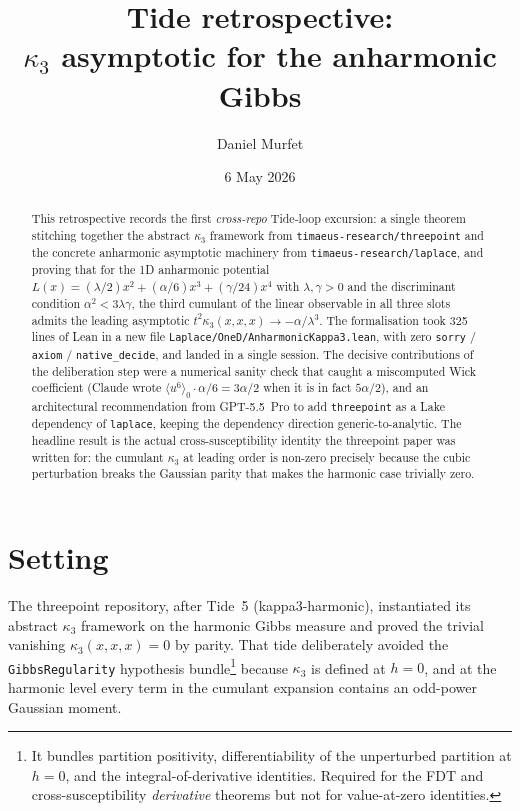 \documentclass[11pt]{article}
\title{Tide retrospective:\\$\kappa_3$ asymptotic for the anharmonic Gibbs}
\author{Daniel Murfet}
\date{6 May 2026}
\begin{document}
\maketitle

\begin{abstract}
This retrospective records the first \emph{cross-repo} Tide-loop
excursion: a single theorem stitching together the abstract $\kappa_3$
framework from \texttt{timaeus-research/threepoint} and the concrete
anharmonic asymptotic machinery from \texttt{timaeus-research/laplace},
and proving that for the 1D anharmonic potential
$L(x) = (\lambda/2)x^2 + (\alpha/6)x^3 + (\gamma/24)x^4$ with
$\lambda, \gamma > 0$ and the discriminant condition $\alpha^2 < 3\lambda\gamma$,
the third cumulant of the linear observable in all three slots admits
the leading asymptotic
$t^2 \kappa_3(x, x, x) \to -\alpha/\lambda^3$. The formalisation took
325 lines of Lean in a new file \texttt{Laplace/OneD/AnharmonicKappa3.lean},
with zero \texttt{sorry} / \texttt{axiom} / \texttt{native\_decide}, and
landed in a single session. The decisive contributions of the
deliberation step were a numerical sanity check that caught a
miscomputed Wick coefficient (Claude wrote $\langle u^6 \rangle_0 \cdot \alpha/6 = 3\alpha/2$
when it is in fact $5\alpha/2$), and an architectural recommendation
from GPT-5.5~Pro to add \texttt{threepoint} as a Lake dependency of
\texttt{laplace}, keeping the dependency direction
generic-to-analytic. The headline result is the actual cross-susceptibility
identity the threepoint paper was written for: the cumulant
$\kappa_3$ at leading order is non-zero precisely because the cubic
perturbation breaks the Gaussian parity that makes the harmonic case
trivially zero.
\end{abstract}

\section{Setting}

The threepoint repository, after Tide~5 (kappa3-harmonic), instantiated
its abstract $\kappa_3$ framework on the harmonic Gibbs measure and
proved the trivial vanishing
$\kappa_3(x, x, x) = 0$ by parity. That tide deliberately avoided the
\texttt{GibbsRegularity} hypothesis bundle\footnote{It bundles partition
positivity, differentiability of the unperturbed partition at $h = 0$,
and the integral-of-derivative identities. Required for the FDT and
cross-susceptibility \emph{derivative} theorems but not for value-at-zero
identities.} because $\kappa_3$ is defined at $h = 0$, and at the
harmonic level every term in the cumulant expansion contains an odd-power
Gaussian moment.
\end{document}
